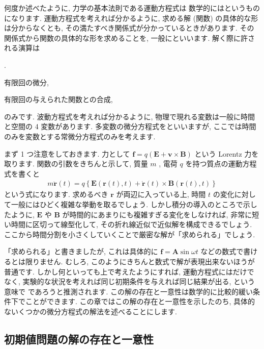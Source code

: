 \documentclass[openany, a4paper, oneside]{jsbook}
\newcounter{enum2}
\renewenvironment{enumerate}{%
\begin{list}%
{%
\arabic{enum2}.\ \,%
}%
{%
\usecounter{enum2}
\setlength{\itemindent}{0pt}%
\setlength{\leftmargin}{15pt}%
\setlength{\rightmargin}{0pt}%
\setlength{\labelsep}{0pt}%
\setlength{\labelwidth}{6pt}%
\setlength{\itemsep}{0pt}%
\setlength{\parsep}{0pt}%
\setlength{\listparindent}{0pt}%
}
}{%
\end{list}%
}
\theoremstyle{break}
\theoremstyle{breakdefn}
\begin{document}
何度か述べたように, 力学の基本法則である運動方程式は
数学的にはというものになります.
運動方程式を考えれば分かるように,
求める解 (関数) の具体的な形は分からなくとも, その満たすべき関係式が分かっているときがあります.
その関係式から関数の具体的な形を求めることを,
一般にといいます.
解く際に許される演算は
\begin{enumerate}
\item[1)] 有限回の微分,
\item[2)] 有限回の与えられた関数との合成,
\end{enumerate}
のみです.
波動方程式を考えれば分かるように, 物理で現れる変数は一般に時間と空間の 4 変数があります.
多変数の微分方程式をといいますが,
ここでは時間のみを変数とする常微分方程式のみを考えます.

まず 1 つ注意をしておきます.
力として $\bm{f} = q ( \bm{E} + \bm{v} \times \bm{B} )$ という Lorentz 力を取ります.
関数の引数をきちんと示して, 質量 $m$ , 電荷 $q$ を持つ質点の運動方程式を書くと
\begin{gather}
m \ddot{ \bm{r} } (t)
=
q \left \{ \bm{E} ( \bm{r} (t) , t ) + \dot{ \bm{r} } (t) \times \bm{B} ( \bm{r} (t) , t )  \right \}
\end{gather}
という式になります.
求めるべき $\bm{r}$ が両辺に入っている上, 時間 $t$ の変化に対して一般にはひどく複雑な挙動を取るでしょう.
しかし積分の導入のところで示したように,  $\bm{E}$ や $\bm{B}$ が時間的にあまりにも複雑すぎる変化をしなければ,
非常に短い時間に区切って線型化して, その折れ線近似で近似解を構成できるでしょう.
ここから時間分割を小さくしていくことで厳密な解が「求められる」でしょう.

「求められる」と書きましたが, これは具体的に $\bm{f} = \bm{A} \sin \omega t$ などの数式で書けるとは限りません.
むしろ, このようにきちんと数式で解が表現出来ないほうが普通です.
しかし何といっても上で考えたようにすれば, 運動方程式にはだけでなく,
実験的な状況を考えれば同じ初期条件を与えれば同じ結果が出る, という意味で
であろうと推測されます.
この解の存在と一意性は数学的に比較的緩い条件下でことができます.
この章ではこの解の存在と一意性を示したのち, 具体的ないくつかの微分方程式の解法を述べることにします.
\subsection{初期値問題の解の存在と一意性}
\end{document}
